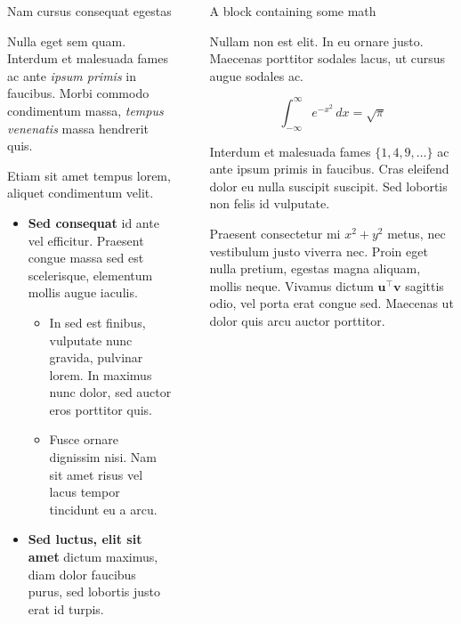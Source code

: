 \documentclass[final]{beamer}
\newlength{\sepwidth}
\newlength{\colwidth}
\newcommand{\separatorcolumn}{\begin{column}{\sepwidth}\end{column}}
\begin{document}
\begin{frame}[t]
\begin{columns}[t]
\begin{column}{\colwidth}
  \begin{block}{Nam cursus consequat egestas}

    Nulla eget sem quam. Interdum et malesuada fames
    ac ante \textit{ipsum primis} in faucibus. Morbi commodo condimentum massa, \textit{tempus venenatis} massa
    hendrerit quis. 

    Etiam sit amet tempus lorem, aliquet condimentum velit. 

    \begin{itemize}
      \item \textbf{Sed consequat} id ante vel efficitur. Praesent congue massa
        sed est scelerisque, elementum mollis augue iaculis.
        \begin{itemize}
          \item In sed est finibus, vulputate
            nunc gravida, pulvinar lorem. In maximus nunc dolor, sed auctor eros
            porttitor quis.
          \item Fusce ornare dignissim nisi. Nam sit amet risus vel lacus
            tempor tincidunt eu a arcu.
        \end{itemize}
      \item \textbf{Sed luctus, elit sit amet} dictum maximus, diam dolor
        faucibus purus, sed lobortis justo erat id turpis.
    \end{itemize}

  \end{block}

\end{column}

\separatorcolumn

\begin{column}{\colwidth}

  \begin{block}{A block containing some math}

    Nullam non est elit. In eu ornare justo. Maecenas porttitor sodales lacus,
    ut cursus augue sodales ac.

    $$
    \int_{-\infty}^{\infty} e^{-x^2}\,dx = \sqrt{\pi}
    $$

    Interdum et malesuada fames $\{1, 4, 9, \ldots\}$ ac ante ipsum primis in
    faucibus. Cras eleifend dolor eu nulla suscipit suscipit. Sed lobortis non
    felis id vulputate.


    Praesent consectetur mi $x^2 + y^2$ metus, nec vestibulum justo viverra
    nec. Proin eget nulla pretium, egestas magna aliquam, mollis neque. Vivamus
    dictum $\mathbf{u}^\intercal\mathbf{v}$ sagittis odio, vel porta erat
    congue sed. Maecenas ut dolor quis arcu auctor porttitor.


\end{block}
\end{column}
\end{columns}
\end{frame}
\end{document}

